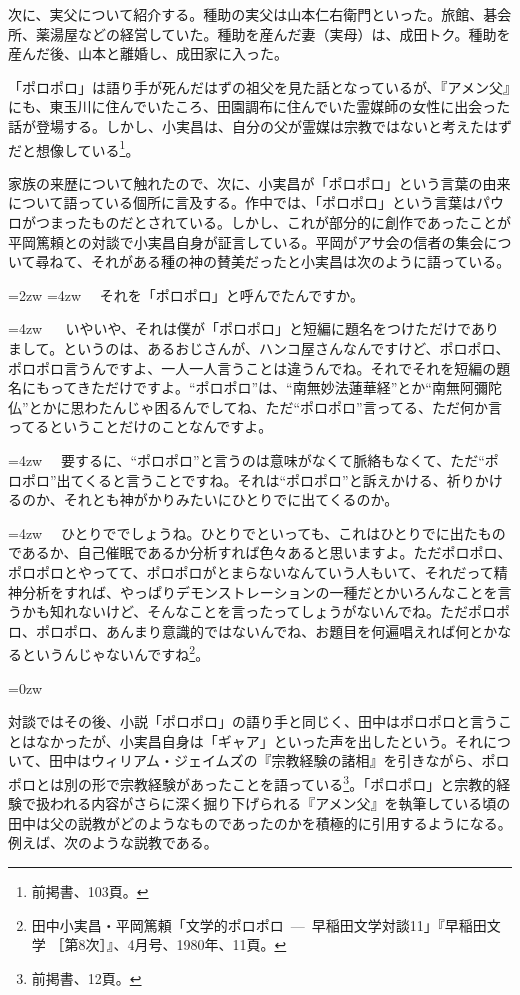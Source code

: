 次に、実父について紹介する。種助の実父は山本仁右衛門といった。旅館、碁会所、薬湯屋などの経営していた。種助を産んだ妻（実母）は、成田トク。種助を産んだ後、山本と離婚し、成田家に入った。

「ポロポロ」は語り手が死んだはずの祖父を見た話となっているが、『アメン父』にも、東玉川に住んでいたころ、田園調布に住んでいた霊媒師の女性に出会った話が登場する。しかし、小実昌は、自分の父が霊媒は宗教ではないと考えたはずだと想像している\footnote{前掲書、103頁。}。

家族の来歴について触れたので、次に、小実昌が「ポロポロ」という言葉の由来について語っている個所に言及する。作中では、「ポロポロ」という言葉はパウロがつまったものだとされている。しかし、これが部分的に創作であったことが平岡篤頼との対談で小実昌自身が証言している。平岡がアサ会の信者の集会について尋ねて、それがある種の神の賛美だったと小実昌は次のように語っている。

\leftskip=2zw
  \hangindent=4zw 　それを「ポロポロ」と呼んでたんですか。

  \hangindent=4zw 　 いやいや、それは僕が「ポロポロ」と短編に題名をつけただけでありまして。というのは、あるおじさんが、ハンコ屋さんなんですけど、ポロポロ、ポロポロ言うんですよ、一人一人言うことは違うんでね。それでそれを短編の題名にもってきただけですよ。``ポロポロ''は、``南無妙法蓮華経''とか``南無阿彌陀仏''とかに思わたんじゃ困るんでしてね、ただ``ポロポロ''言ってる、ただ何か言ってるということだけのことなんですよ。

  \hangindent=4zw 　要するに、``ポロポロ''と言うのは意味がなくて脈絡もなくて、ただ``ポロポロ''出てくると言うことですね。それは``ポロポロ''と訴えかける、祈りかけるのか、それとも神がかりみたいにひとりでに出てくるのか。

  \hangindent=4zw 　ひとりででしょうね。ひとりでといっても、これはひとりでに出たものであるか、自己催眠であるか分析すれば色々あると思いますよ。ただポロポロ、ポロポロとやってて、ポロポロがとまらないなんていう人もいて、それだって精神分析をすれば、やっぱりデモンストレーションの一種だとかいろんなことを言うかも知れないけど、そんなことを言ったってしょうがないんでね。ただポロポロ、ポロポロ、あんまり意識的ではないんでね、お題目を何遍唱えれば何とかなるというんじゃないんですね\footnote{田中小実昌・平岡篤頼「文学的ポロポロ~---~早稲田文学対談11」『早稲田文学 ［第8次］』、4月号、1980年、11頁。}。

\leftskip=0zw

対談ではその後、小説「ポロポロ」の語り手と同じく、田中はポロポロと言うことはなかったが、小実昌自身は「ギャア」といった声を出したという。それについて、田中はウィリアム・ジェイムズの『宗教経験の諸相』を引きながら、ポロポロとは別の形で宗教経験があったことを語っている\footnote{前掲書、12頁。}。「ポロポロ」と宗教的経験で扱われる内容がさらに深く掘り下げられる『アメン父』を執筆している頃の田中は父の説教がどのようなものであったのかを積極的に引用するようになる。例えば、次のような説教である。

